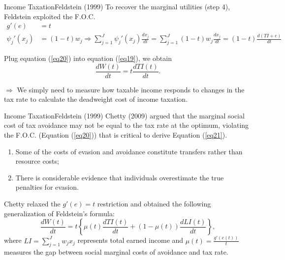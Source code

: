 \documentclass{beamer}
\begin{document}
\begin{frame}{Income Taxation}{Feldstein (1999)}
	To recover the marginal utilities (step 4), Feldstein exploited the F.O.C.
	\begin{equation}\label{eq20}
		\begin{aligned}
			g'(e) &= t \\
			\psi_j'(x_j) &= (1-t)w_j \Rightarrow \sum_{j=1}^J\psi_j'(x_j)\frac{dx_j}{dt} = \sum_{j=1}^J(1-t)w_j\frac{dx_j}{dt} = (1-t)\frac{d(TI+e)}{dt}
		\end{aligned}
	\end{equation}

	Plug equation (\ref{eq20}) into equation (\ref{eq19}), we obtain
	\begin{equation}\label{eq21}
		\frac{dW(t)}{dt} = t\frac{dTI(t)}{dt}.
	\end{equation}

	$\Rightarrow$ We simply need to measure how taxable income responds to changes in the tax rate to calculate the deadweight cost of income taxation.
\end{frame}
\begin{frame}{Income Taxation}{Feldstein (1999)}
	Chetty (2009) argued that the marginal social cost of tax avoidance may not
	be equal to the tax rate at the optimum, violating the F.O.C. (Equation (\ref{eq20})) that is critical to derive Equation (\ref{eq21}).
	\begin{enumerate}
		\item Some of the costs of evasion and avoidance constitute transfers rather than resource costs;
		\item There is considerable evidence that individuals overestimate the true penalties for evasion.
	\end{enumerate}
	Chetty relaxed the $g'(e)=t$ restriction and obtained the following generalization of Feldstein’s formula:
	\begin{equation}
		\frac{dW(t)}{dt} = t\left\{\mu(t)\frac{dTI(t)}{dt}+(1-\mu(t))\frac{dLI(t)}{dt}\right\},
	\end{equation}
	where $LI=\sum_{j=1}^Jw_jx_j$ represents total earned income and $\mu(t)=\frac{g'(e(t))}{t}$ measures the gap between social marginal costs of avoidance and tax rate.
\end{frame}
\end{document}

